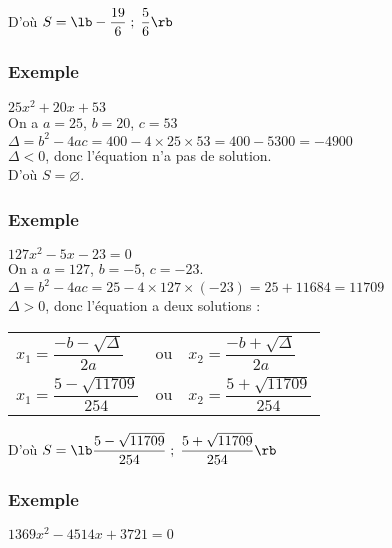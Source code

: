D'où $S = \lb -\dfrac{19}{6} \; ; \; \dfrac{5}{6} \rb $ 

\subsubsection{Exemple }

$25x^2 + 20x + 53$ \\

On a $a = 25$, $b = 20$, $c = 53$ \\

$ \Delta = b^2 - 4ac = 400 - 4 \times 25 \times 53 = 400 - 5 300 = -4 900$ \\

$\Delta < 0$, donc l'équation n'a pas de solution. \\

D'où $S = \varnothing$. 

\subsubsection{Exemple }

$127x^2 - 5x - 23 = 0$ \\

On a $a = 127$, $b = -5$, $c = -23$. \\

$ \Delta = b^2 - 4ac = 25 - 4 \times 127 \times \left(-23\right) = 25 + 11684 = 11 709$ \\

$\Delta > 0$, donc l'équation a deux solutions : 

\begin{tabular}{lll}
$x_1 = \dfrac{-b - \sqrt{\Delta}}{2a}$ & ou & $x_2 = \dfrac{-b + \sqrt{\Delta}}{2a}$ \vspace*{.3cm} \\
$ x_1 = \dfrac{5 - \sqrt{11709}}{254}$ & ou &$x_2 = \dfrac{5 + \sqrt{11709}}{254}$ \vspace*{.3cm} \\
\end{tabular}

D'où $S = \lb \dfrac{5 - \sqrt{11 709}}{254} \; ; \; \dfrac{5 + \sqrt{11 709}}{254} \rb$ 

\subsubsection{Exemple }

$1369x^2 - 4514x + 3721 = 0 $ \\

